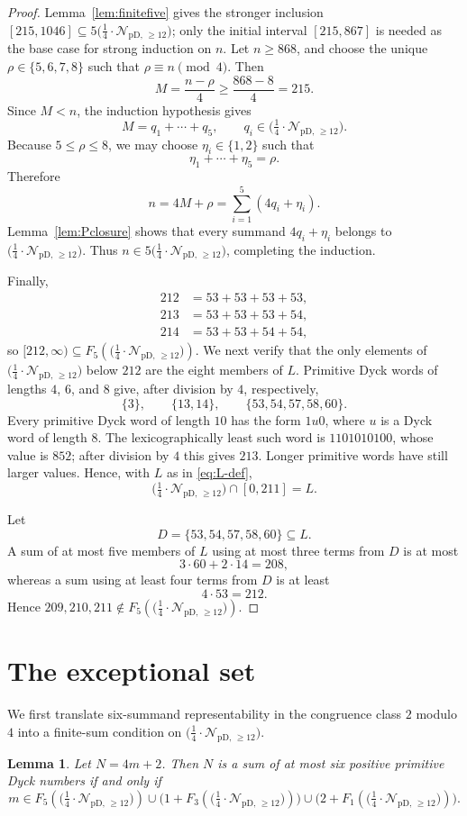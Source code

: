 \documentclass[12pt]{article}
\theoremstyle{plain}
\newtheorem{lemma}[theorem]{Lemma}
\newcommand{\Pset}{\bigl(\tfrac14\cdot
  \mathcal{N}_{\mathrm{pD},\,\geq12}\bigr)}
\begin{document}
\begin{proof}
Lemma~\ref{lem:finitefive} gives the stronger inclusion
$[215,1046]\subseteq5\Pset$; only the initial interval $[215,867]$ is
needed as the base case for strong induction on $n$.  Let $n\geq868$, and
choose the unique $\rho\in\{5,6,7,8\}$ such that
$\rho\equiv n\pmod4$.  Then
\[
 M=\frac{n-\rho}{4}\geq\frac{868-8}{4}=215.
\]
Since $M<n$, the induction hypothesis gives
\[
 M=q_1+\cdots+q_5,\qquad q_i\in\Pset.
\]
Because $5\leq\rho\leq8$, we may choose $\eta_i\in\{1,2\}$ such that
\[
 \eta_1+\cdots+\eta_5=\rho.
\]
Therefore
\[
 n=4M+\rho=\sum_{i=1}^{5}(4q_i+\eta_i).
\]
Lemma~\ref{lem:Pclosure} shows that every summand $4q_i+\eta_i$ belongs
to $\Pset$.  Thus $n\in5\Pset$, completing the induction.

Finally,
\[
\begin{aligned}
212&=53+53+53+53,\\
213&=53+53+53+54,\\
214&=53+53+54+54,
\end{aligned}
\]
so $[212,\infty)\subseteq F_5(\Pset)$.  We next verify that the only elements of $\Pset$ below $212$ are the
eight members of $L$.  Primitive Dyck words of lengths $4$, $6$, and $8$
give, after division by $4$, respectively,
\[
 \{3\},\qquad \{13,14\},\qquad \{53,54,57,58,60\}.
\]
Every primitive Dyck word of length $10$ has the form $1u0$, where $u$
is a Dyck word of length $8$.  The lexicographically least such word is
$1101010100$, whose value is $852$; after division by $4$ this gives
$213$.  Longer primitive words have still larger values.  Hence, with $L$ as
in \eqref{eq:L-def},
\[
 \Pset\cap[0,211]=L.
\]

Let
\[
 D=\{53,54,57,58,60\}\subseteq L.
\]
A sum of at most five members of $L$ using at most three terms from $D$
is at most
\[
 3\cdot60+2\cdot14=208,
\]
whereas a sum using at least four terms from $D$ is at least
\[
 4\cdot53=212.
\]
Hence $209,210,211\notin F_5(\Pset)$.
\end{proof}

\section{The exceptional set}\label{sec:exceptions}

We first translate six-summand representability in the congruence class
$2$ modulo $4$ into a finite-sum condition on $\Pset$.

\begin{lemma}\label{lem:sixcriterion}
Let $N=4m+2$.  Then $N$ is a sum of at most six positive primitive Dyck
numbers if and only if
\[
 m\in F_5(\Pset)
 \cup\bigl(1+F_3(\Pset)\bigr)
 \cup\bigl(2+F_1(\Pset)\bigr).
\]
\end{lemma}
\end{document}
